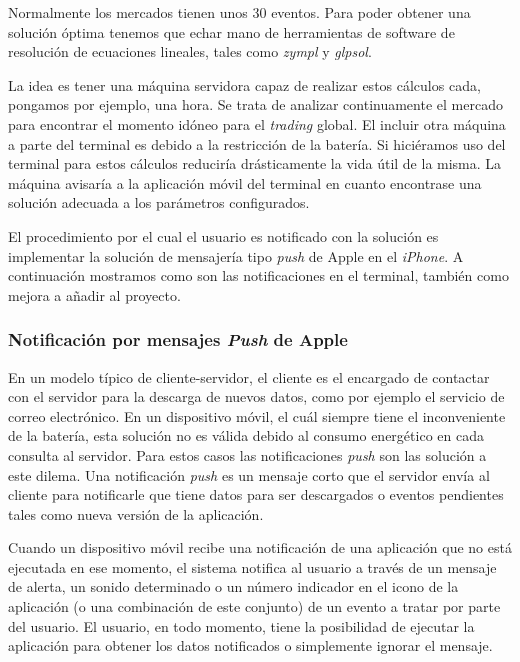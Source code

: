  Normalmente los mercados tienen unos 30 eventos. Para poder obtener una solución óptima tenemos que echar mano de herramientas de software de resolución de ecuaciones lineales, tales como \emph{zympl} y \emph{glpsol}. 
  
  
  
   La idea es tener una máquina servidora capaz de realizar estos cálculos cada, pongamos por ejemplo, una hora. Se trata de analizar continuamente el mercado para encontrar el momento idóneo para el \emph{trading} global. El incluir otra máquina a parte del terminal es debido a la restricción de la batería. Si hiciéramos uso del terminal para estos cálculos reduciría drásticamente la vida útil de la misma. La máquina avisaría a la aplicación móvil del terminal en cuanto encontrase una solución adecuada a los parámetros configurados. 
   
    El procedimiento por el cual el usuario es notificado con la solución es implementar la solución de mensajería tipo \emph{push} de Apple en el \emph{iPhone}. A continuación mostramos como son las notificaciones en el terminal, también como mejora a añadir al proyecto.
    
 \subsubsection{Notificación por mensajes \emph{Push} de Apple}
   
   En un modelo típico de cliente-servidor, el cliente es el encargado de contactar con el servidor para la descarga de nuevos datos, como por ejemplo el servicio de correo electrónico. En un dispositivo móvil, el cuál siempre tiene el inconveniente de la batería, esta solución no es válida debido al consumo energético en cada consulta al servidor. Para estos casos las notificaciones \emph{push} son las solución a este dilema. Una notificación \emph{push} es un mensaje corto que el servidor envía al cliente para notificarle que tiene datos para ser descargados o eventos pendientes tales como nueva versión de la aplicación. 
   
    Cuando un dispositivo móvil recibe una notificación de una aplicación que no está ejecutada en ese momento, el sistema notifica al usuario a través de un mensaje de alerta, un sonido determinado o un número indicador en el icono de la aplicación (o una combinación de este conjunto) de un evento a tratar por parte del usuario. El usuario, en todo momento, tiene la posibilidad de ejecutar la aplicación para obtener los datos notificados o simplemente ignorar el mensaje.

